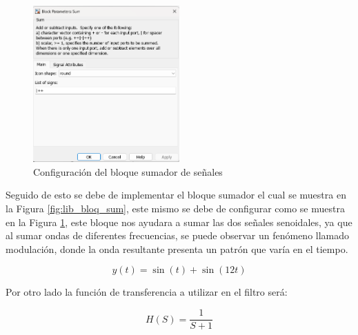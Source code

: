 \begin{figure}[h!]
    \centering
    \includegraphics[width=0.5\textwidth]{fig/especifico_2/CASO_ESTUDIO_FILTRO/sum_1.png}
    \caption{Configuración del bloque sumador de señales}
    \label{fig:lib_bloq_sum_conf}
\end{figure}


Seguido de esto se debe de implementar el bloque sumador el cual se muestra en la Figura \ref{fig:lib_bloq_sum}, este mismo se debe de configurar como se muestra en la Figura \ref{fig:lib_bloq_sum_conf}, este bloque nos ayudara a sumar las dos señales senoidales, ya que al sumar ondas de diferentes frecuencias, se puede observar un fenómeno llamado modulación, donde la onda resultante presenta un patrón que varía en el tiempo.

\begin{equation}
    y(t) = \sin(t) + \sin(12t)
    \label{eq:funcion_de_suma_de_ondas}
\end{equation}
\newpage

Por otro lado la función de transferencia a utilizar en el filtro será:

\begin{equation}
    H(S) = \frac{1}{S+1}
    \label{eq:funcion_de_transferencia_filtro}
\end{equation}

